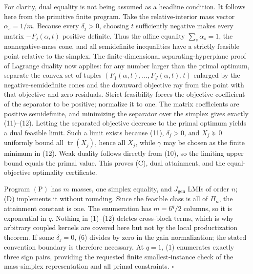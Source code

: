 For clarity, dual equality is not being assumed as a headline condition.  It follows here from the primitive finite program.  Take the relative-interior mass vector \(\alpha_s=1/m\).  Because every \(\delta_j>0\), choosing \(t\) sufficiently negative makes every matrix \(-F_j(\alpha,t)\) positive definite.  Thus the affine equality \(\sum_s\alpha_s=1\), the nonnegative-mass cone, and all semidefinite inequalities have a strictly feasible point relative to the simplex.  The finite-dimensional separating-hyperplane proof of Lagrange duality now applies: for any number larger than the primal optimum, separate the convex set of tuples \((F_1(\alpha,t),\ldots,F_J(\alpha,t),t)\) enlarged by the negative-semidefinite cones and the downward objective ray from the point with that objective and zero residuals.  Strict feasibility forces the objective coefficient of the separator to be positive; normalize it to one.  The matrix coefficients are positive semidefinite, and minimizing the separator over the simplex gives exactly (11)--(12).  Letting the separated objective decrease to the primal optimum yields a dual feasible limit.  Such a limit exists because (11), \(\delta_j>0\), and \(X_j\succeq0\) uniformly bound all \(\operatorname{tr}(X_j)\), hence all \(X_j\), while \(\gamma\) may be chosen as the finite minimum in (12).  Weak duality follows directly from (10), so the limiting upper bound equals the primal value.  This proves (C), dual attainment, and the equal-objective optimality certificate.

Program \((\mathrm P)\) has \(m\) masses, one simplex equality, and \(J_{\mathrm{gen}}\) LMIs of order \(n\); (D) implements it without rounding.  Since the feasible class is all of \(\Pi_n\), the attainment constant is one.  The enumeration has \(m=6^q/2\) columns, so it is exponential in \(q\).  Nothing in (1)--(12) deletes cross-block terms, which is why arbitrary coupled kernels are covered here but not by the local productization theorem.  If some \(\delta_j=0\), (6) divides by zero in the gain normalization; the stated convention boundary is therefore necessary.  At \(q=1\), (1) enumerates exactly three sign pairs, providing the requested finite smallest-instance check of the mass-simplex representation and all primal constraints. \(\square\)